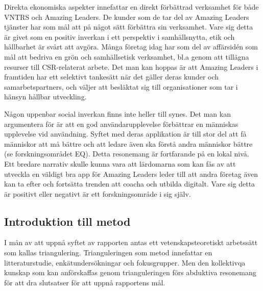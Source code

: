 Direkta ekonomiska aspekter innefattar en direkt förbättrad verksamhet för både VNTRS och Amazing Leaders. De kunder som de tar del av Amazing Leaders tjänster har som mål att på något sätt förbättra sin verksamhet. Vare sig detta är givet som en positiv inverkan i ett perspektiv i samhällsnytta, etik och hållbarhet är svårt att avgöra. Många företag idag har som del av affärsidén som mål att bedriva en grön och samhällsetisk verksamhet, bl.a genom att tillägna resurser till CSR-relaterat arbete. Det man kan hoppas är att Amazing Leaders i framtiden har ett selektivt tankesätt när det gäller deras kunder och samarbetspartners, och väljer att besläktat sig till organisationer som tar i hänsyn hållbar utveckling. 
\newline

Någon uppenbar social inverkan finns inte heller till synes. Det man kan argumentera för är att en god användarupplevelse förbättrar en människas upplevelse vid användning. Syftet med deras applikation är till stor del att få människor att må bättre och att ledare även ska förstå andra människor bättre (se forskningsområdet EQ). Detta resonemang är fortfarande på en lokal nivå. Ett bredare narrativ skulle kunna vara att lärdomarna som kan fås av att utveckla en väldigt bra app för Amazing Leaders leder till att andra företag även kan ta efter och fortsätta trenden att coacha och utbilda digitalt. Vare sig detta är positivt eller negativt är ett forskningsområde i sig själv. 



\subsection{Introduktion till metod}
I mån av att uppnå syftet av rapporten antas ett vetenskapsteoretiskt arbetssätt som kallas triangulering. Trianguleringen som metod innefattar en litteraturstudie, enkätundersökningar och fokusgrupper. Men den kollektivqa kunskap som kan anförskaffas genom trianguleringen förs abduktiva resonemang för att dra slutsatser för att uppnå rapportens mål. 
\newline

